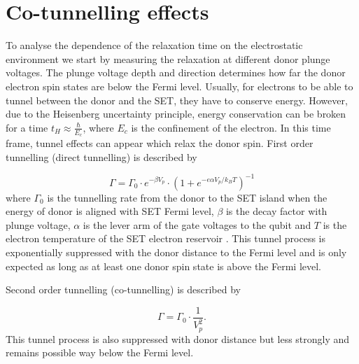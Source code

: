 \documentclass[%
 reprint,
 amsmath,amssymb,
 aps,
]{revtex4-1}
\begin{document}
\section{\label{sec:cotunnelling}Co-tunnelling effects}

To analyse the dependence of the relaxation time on the electrostatic environment we start by measuring the relaxation at different donor plunge voltages. The plunge voltage depth and direction determines how far the donor electron spin states are below the Fermi level. 
Usually, for electrons to be able to tunnel between the donor and the SET, they have to conserve energy. However, due to the Heisenberg uncertainty principle, energy conservation can be broken for a time $t_H\approx\frac{\hbar}{E_c}$, where $E_c$ is the confinement of the electron. In this time frame, tunnel effects can appear which relax the donor spin. First order tunnelling (direct tunnelling) is described by 

\begin{equation}\label{eq:directt}
\Gamma = \Gamma_0\cdot e^{-\beta V_p}\cdot\left(1+e^{-{e\alpha V_p}/{k_B T}}\right)^{-1}
\end{equation}
where $\Gamma_0$ is the tunnelling rate from the donor to the SET island when the energy of donor is aligned with SET Fermi level, $\beta$ is the decay factor with plunge voltage, $\alpha$ is the lever arm of the gate voltages to the qubit and $T$ is the electron temperature of the SET electron reservoir \cite{MacLean2007}. This tunnel process is exponentially suppressed with the donor distance to the Fermi level and is only expected as long as at least one donor spin state is above the Fermi level. 

Second order tunnelling (co-tunnelling) is described by 

\begin{equation}\label{eq:cot}
\Gamma = \Gamma_0 \cdot \frac{1}{V_p^2}.
\end{equation}
This tunnel process is also suppressed with donor distance but less strongly and remains possible way below the Fermi level. 
\end{document}
